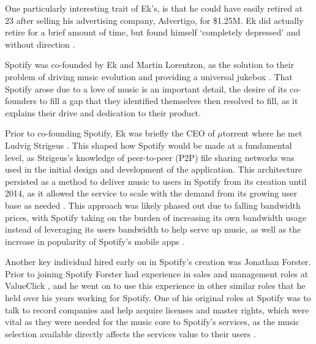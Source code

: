 
One particularly interesting trait of Ek's, is that he could have easily retired at 23 after selling his advertising company, Advertigo, for \$1.25M. Ek did actually retire for a brief amount of time, but found himself `completely depressed' and without direction \parencite{Taube2014}.

Spotify was co-founded by Ek and Martin Lorentzon, as the solution to their problem of driving music evolution and providing a universal jukebox \parencite{ft_spotify}. That Spotify arose due to a love of music is an important detail, the desire of its co-founders to fill a gap that they identified themselves then resolved to fill, as it explains their drive and dedication to their product.

Prior to co-founding Spotify, Ek was briefly the CEO of $\mu$torrent where he met Ludvig Strigeus \parencite{ft_lunch_ek}. This shaped how Spotify would be made at a fundamental level, as Strigeus's knowledge of peer-to-peer (P2P) file sharing networks was used in the initial design and development of the application. This architecture persisted as a method to deliver music to users in Spotify from its creation until 2014, as it allowed the service to scale with the demand from its growing user base as needed \parencite{how_spotify_works, spotify_shut_down_p2p}. This approach was likely phased out due to falling bandwidth prices, with Spotify taking on the burden of increasing its own bandwidth usage instead of leveraging its users bandwidth to help serve up music, as well as the increase in popularity of Spotify's mobile apps \parencite{spotify_shut_down_p2p}.

Another key individual hired early on in Spotify's creation was Jonathan Forster. Prior to joining Spotify Forster had experience in sales and management roles at ValueClick \parencite{forster_linkedin}, and he went on to use this experience in other similar roles that he held over his years working for Spotify. One of his original roles at Spotify was to talk to record companies and help acquire licenses and master rights, which were vital as they were needed for the music core to Spotify's services, as the music selection available directly affects the services value to their users \parencite{jforsterinterview1, jforsterinterview2}.


